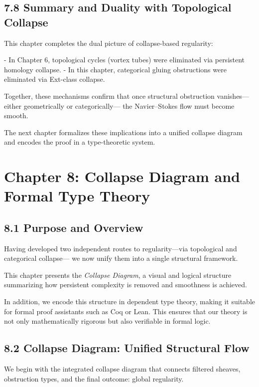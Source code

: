 \documentclass[11pt]{article}
\begin{document}
\subsection{7.8 Summary and Duality with Topological Collapse}

This chapter completes the dual picture of collapse-based regularity:

- In Chapter 6, topological cycles (vortex tubes) were eliminated via persistent homology collapse.
- In this chapter, categorical gluing obstructions were eliminated via Ext-class collapse.

Together, these mechanisms confirm that once structural obstruction vanishes—either geometrically or categorically—  
the Navier–Stokes flow must become smooth.

The next chapter formalizes these implications into a unified collapse diagram and encodes the proof in a type-theoretic system.



\section{Chapter 8: Collapse Diagram and Formal Type Theory}

\subsection{8.1 Purpose and Overview}

Having developed two independent routes to regularity—via topological and categorical collapse—  
we now unify them into a single structural framework.

This chapter presents the \emph{Collapse Diagram}, a visual and logical structure summarizing how persistent complexity is removed and smoothness is achieved.

In addition, we encode this structure in dependent type theory, making it suitable for formal proof assistants such as Coq or Lean.  
This ensures that our theory is not only mathematically rigorous but also verifiable in formal logic.

\subsection{8.2 Collapse Diagram: Unified Structural Flow}

We begin with the integrated collapse diagram that connects filtered sheaves, obstruction types, and the final outcome: global regularity.
\end{document}
